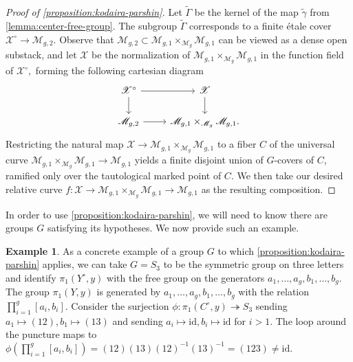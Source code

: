 \documentclass[12 pt]{amsart}
\theoremstyle{plain}
\theoremstyle{definition}
\newtheorem{example}[subsubsection]{Example}
\theoremstyle{remark}
\numberwithin{equation}{section}
\begin{document}
\subsubsection{}\label{subsubsection:proof-kodaira-parshin}\begin{proof}[Proof of \autoref{proposition:kodaira-parshin}]
Let $\widetilde{\Gamma}$ be the kernel of the map $\widetilde{\gamma}$ from
\autoref{lemma:center-free-group}.
The subgroup $\widetilde{\Gamma}$ corresponds to a finite \'etale cover
$\mathscr X^\circ \to \mathscr M_{g,2}$. 
Observe that $\mathscr M_{g,2} \subset \mathscr{M}_{g,1} \times_{\mathscr M_g} \mathscr{M}_{g,1}$
can be viewed as a dense open substack, and
let $\mathscr{X}$ be the normalization
of $\mathscr{M}_{g,1} \times_{\mathscr M_g} \mathscr{M}_{g,1}$ in the function
field of $\mathscr{X}^\circ,$ forming the following cartesian diagram
\begin{equation}
	\label{equation:}
	\begin{tikzcd} 
		\mathscr X^\circ \ar {r} \ar {d} & \mathscr X \ar {d} \\
		\mathscr M_{g,2} \ar {r} & \mathscr{M}_{g,1} \times_{\mathscr
		M_g} \mathscr{M}_{g,1}.
\end{tikzcd}\end{equation}
Restricting the natural map $\mathscr{X}\to\mathscr{M}_{g,1} \times_{\mathscr M_g} \mathscr{M}_{g,1}$ to a fiber $C$ of the universal curve $\mathscr{M}_{g,1} \times_{\mathscr M_g} \mathscr{M}_{g,1} \to \mathscr M_{g,1}$ yields a finite disjoint union of $G$-covers of $C$, ramified only over the tautological marked point of $C$.
We then take our desired relative curve $f: \mathscr X \to \mathscr{M}_{g,1} \times_{\mathscr M_g}
\mathscr{M}_{g,1} \to \mathscr M_{g,1}$ as the resulting
composition.
\end{proof}

In order to use \autoref{proposition:kodaira-parshin}, we will need to know
there are groups $G$ satisfying its hypotheses. We now provide such an example.
\begin{example}
	\label{example:kodaira-parshin}
	As a concrete example of a group $G$ to which 
	\autoref{proposition:kodaira-parshin} applies, we can take $G = S_3$ to be the
	symmetric group on three letters and identify $\pi_1(Y^\circ, y)$
with the free group on the generators $a_1, \ldots, a_g, b_1, \ldots, b_g$. The group $\pi_1(Y, y)$
is generated by $a_1, \ldots, a_g, b_1, \ldots, b_g$ with the relation
$\prod_{i=1}^g \left[ a_i, b_i \right]$.
Consider the surjection $\phi: \pi_1(C^\circ, y)\twoheadrightarrow S_3$
sending $a_1\mapsto (12), b_1 \mapsto (13)$ and sending $a_i \mapsto
\mathrm{id}, b_i
\mapsto \mathrm{id}$ for $i > 1$.
The loop around the puncture maps to 
$\phi(\prod_{i=1}^g \left[ a_i, b_i \right]) = (12)(13)(12)^{-1}(13)^{-1} =
(123) \neq \mathrm{id}$.
\end{example}
\end{document}
